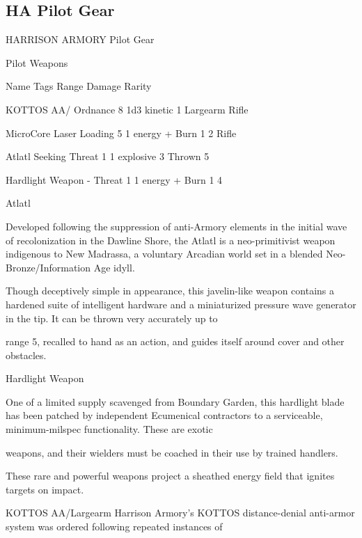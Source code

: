 \subsection{HA Pilot Gear}

                                  HARRISON ARMORY Pilot Gear

                                                    Pilot Weapons

  Name                    Tags                                      Range            Damage                  Rarity

 KOTTOS AA/               Ordnance                                  8                1d3 kinetic             1
 Largearm Rifle

 MicroCore Laser          Loading                                  5                 1 energy + Burn 1       2
 Rifle

 Atlatl                   Seeking                                  Threat 1
         1 explosive             3
                                                                   Thrown 5

 Hardlight Weapon         -                                        Threat 1          1 energy + Burn 1       4

Atlatl

Developed following the suppression of anti-Armory elements in the initial wave of recolonization in the
Dawline Shore, the Atlatl is a neo-primitivist weapon indigenous to New Madrassa, a voluntary Arcadian
world set in a blended Neo-Bronze/Information Age idyll.

Though deceptively simple in appearance, this javelin-like weapon contains a hardened suite of intelligent
hardware and a miniaturized pressure wave generator in the tip. It can be thrown very accurately up to

range 5, recalled to hand as an action, and guides itself around cover and other obstacles.


Hardlight Weapon

One of a limited supply scavenged from Boundary Garden, this hardlight blade has been patched by
independent Ecumenical contractors to a serviceable, minimum-milspec functionality. These are exotic

weapons, and their wielders must be coached in their use by trained handlers.

These rare and powerful weapons project a sheathed energy field that ignites targets on impact.


KOTTOS AA/Largearm
Harrison Armory's KOTTOS distance-denial anti-armor system was ordered following repeated instances of

